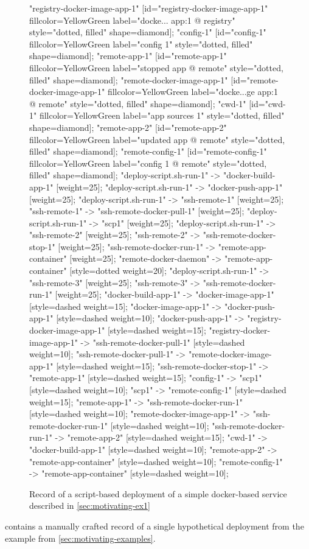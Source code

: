 \begin{figure}[p]
\begin{sideways}
{"registry-docker-image-app-1" [id="registry-docker-image-app-1" fillcolor=YellowGreen label="docke... app:1 @ registry" style="dotted, filled" shape=diamond];
"config-1" [id="config-1" fillcolor=YellowGreen label="config 1" style="dotted, filled" shape=diamond];
"remote-app-1" [id="remote-app-1" fillcolor=YellowGreen label="stopped app @ remote" style="dotted, filled" shape=diamond];
"remote-docker-image-app-1" [id="remote-docker-image-app-1" fillcolor=YellowGreen label="docke...ge app:1 @ remote" style="dotted, filled" shape=diamond];
"cwd-1" [id="cwd-1" fillcolor=YellowGreen label="app sources 1" style="dotted, filled" shape=diamond];
"remote-app-2" [id="remote-app-2" fillcolor=YellowGreen label="updated app @ remote" style="dotted, filled" shape=diamond];
"remote-config-1" [id="remote-config-1" fillcolor=YellowGreen label="config 1 @ remote" style="dotted, filled" shape=diamond];
"deploy-script.sh-run-1" -> "docker-build-app-1" [weight=25];
"deploy-script.sh-run-1" -> "docker-push-app-1" [weight=25];
"deploy-script.sh-run-1" -> "ssh-remote-1" [weight=25];
"ssh-remote-1" -> "ssh-remote-docker-pull-1" [weight=25];
"deploy-script.sh-run-1" -> "scp1" [weight=25];
"deploy-script.sh-run-1" -> "ssh-remote-2" [weight=25];
"ssh-remote-2" -> "ssh-remote-docker-stop-1" [weight=25];
"ssh-remote-docker-run-1" -> "remote-app-container" [weight=25];
"remote-docker-daemon" -> "remote-app-container" [style=dotted weight=20];
"deploy-script.sh-run-1" -> "ssh-remote-3" [weight=25];
"ssh-remote-3" -> "ssh-remote-docker-run-1" [weight=25];
"docker-build-app-1" -> "docker-image-app-1" [style=dashed weight=15];
"docker-image-app-1" -> "docker-push-app-1" [style=dashed weight=10];
"docker-push-app-1" -> "registry-docker-image-app-1" [style=dashed weight=15];
"registry-docker-image-app-1" -> "ssh-remote-docker-pull-1" [style=dashed weight=10];
"ssh-remote-docker-pull-1" -> "remote-docker-image-app-1" [style=dashed weight=15];
"ssh-remote-docker-stop-1" -> "remote-app-1" [style=dashed weight=15];
"config-1" -> "scp1" [style=dashed weight=10];
"scp1" -> "remote-config-1" [style=dashed weight=15];
"remote-app-1" -> "ssh-remote-docker-run-1" [style=dashed weight=10];
"remote-docker-image-app-1" -> "ssh-remote-docker-run-1" [style=dashed weight=10];
"ssh-remote-docker-run-1" -> "remote-app-2" [style=dashed weight=15];
"cwd-1" -> "docker-build-app-1" [style=dashed weight=10];
"remote-app-2" -> "remote-app-container" [style=dashed weight=10];
"remote-config-1" -> "remote-app-container" [style=dashed weight=10];
}
\end{sideways}
\vspace{-4em}
    \caption{Record of a script-based deployment of a simple docker-based service described in \cref{sec:motivating-ex1}}
    \label{fig:motivating-ex1-dot}
\end{figure}
 contains a manually crafted record of a single hypothetical deployment from the example from \cref{sec:motivating-examples}.

